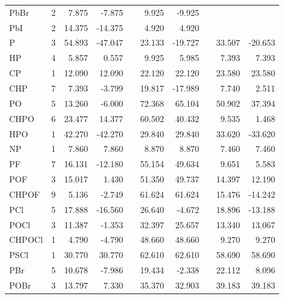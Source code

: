 \begin{table}
\begin{center}
\begin{tabular}{lrrrrrrrrr}
  PbBr      &   2 &    7.875 &   -7.875 &     &    9.925 &   -9.925 &     &          &          \\
  PbI       &   2 &   14.375 &  -14.375 &     &    4.920 &    4.920 &     &          &          \\
      P       &      3 &   54.893 &  -47.047 &  &   23.133 &  -19.727 &  &   33.507 &  -20.653 \\
      HP      &      4 &    5.857 &    0.557 &  &    9.925 &    5.985 &  &    7.393 &    7.393 \\
      CP      &      1 &   12.090 &   12.090 &  &   22.120 &   22.120 &  &   23.580 &   23.580 \\
      CHP     &      7 &    7.393 &   -3.799 &  &   19.817 &  -17.989 &  &    7.740 &    2.511 \\
      PO      &      5 &   13.260 &   -6.000 &  &   72.368 &   65.104 &  &   50.902 &   37.394 \\
      CHPO    &      6 &   23.477 &   14.377 &  &   60.502 &   40.432 &  &    9.535 &    1.468 \\
      HPO     &      1 &   42.270 &  -42.270 &  &   29.840 &   29.840 &  &   33.620 &  -33.620 \\
      NP      &      1 &    7.860 &    7.860 &  &    8.870 &    8.870 &  &    7.460 &    7.460 \\
      PF      &      7 &   16.131 &  -12.180 &  &   55.154 &   49.634 &  &    9.651 &    5.583 \\
      POF     &      3 &   15.017 &    1.430 &  &   51.350 &   49.737 &  &   14.397 &   12.190 \\
      CHPOF   &      9 &    5.136 &   -2.749 &  &   61.624 &   61.624 &  &   15.476 &  -14.242 \\
      PCl     &      5 &   17.888 &  -16.560 &  &   26.640 &   -4.672 &  &   18.896 &  -13.188 \\
      POCl    &      3 &   11.387 &   -1.353 &  &   32.397 &   25.657 &  &   13.340 &   13.067 \\
      CHPOCl  &      1 &    4.790 &   -4.790 &  &   48.660 &   48.660 &  &    9.270 &    9.270 \\
      PSCl    &      1 &   30.770 &   30.770 &  &   62.610 &   62.610 &  &   58.690 &   58.690 \\
      PBr     &      5 &   10.678 &   -7.986 &  &   19.434 &   -2.338 &  &   22.112 &    8.096 \\
      POBr    &      3 &   13.797 &    7.330 &  &   35.370 &   32.903 &  &   39.183 &   39.183 \\

\end{tabular}
\end{center}
\end{table}
